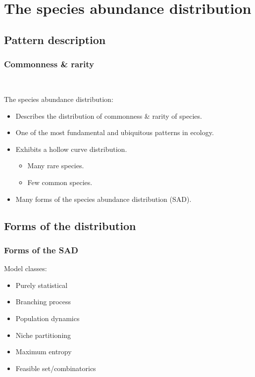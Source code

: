 \documentclass[14pt]{beamer}
\begin{document}
\section{The species abundance distribution}
\subsection{Pattern description}
\begin{frame}[t]{}
\frametitle{Commonness \& rarity}
~\\
\begin{large}
The species abundance distribution:
\end{large}
\begin{itemize}
\item Describes the distribution of commonness \& rarity of species.
\item One of the most fundamental and ubiquitous patterns in ecology.
\item Exhibits a hollow curve distribution.
\begin{itemize}
\item Many rare species.
\item Few common species.
~\\
\end{itemize}
\item Many forms of the species abundance distribution (SAD).
\end{itemize}
\end{frame}

\subsection{Forms of the distribution}
\begin{frame}
\frametitle{Forms of the SAD}
\begin{large}
Model classes:
\end{large}
\begin{itemize}
\item Purely statistical
\item Branching process
\item Population dynamics
\item Niche partitioning
\item Maximum entropy
\item Feasible set/combinatorics
\end{itemize}
\end{frame}
 
\end{document}

